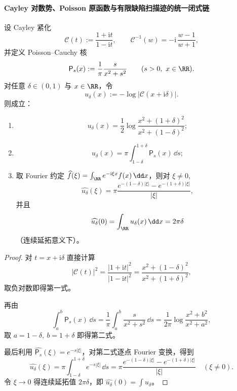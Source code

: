 \paragraph{Cayley 对数势、Poisson 原函数与有限缺陷扫描迹的统一闭式链}

\begin{theorem}\label{thm:xi-cayley-modulus-poisson-fourier-fingerprint}
设 Cayley 紧化
\[
\mathcal C(t):=\frac{1+\mathrm{i}t}{1-\mathrm{i}t},\qquad
\mathcal C^{-1}(w)=-\mathrm{i}\,\frac{w-1}{w+1},
\]
并定义 Poisson--Cauchy 核
\[
\mathsf P_s(x):=\frac{1}{\pi}\frac{s}{x^2+s^2}\qquad(s>0,\ x\in\RR).
\]
对任意 \(\delta\in(0,1)\) 与 \(x\in\RR\)，令
\[
u_\delta(x):=-\log\bigl|\mathcal C(x+\mathrm{i}\delta)\bigr|.
\]
则成立：
\begin{enumerate}
  \item
  \[
  u_\delta(x)=\frac12\log\frac{x^2+(1+\delta)^2}{x^2+(1-\delta)^2};
  \]
  \item
  \[
  u_\delta(x)=\pi\int_{1-\delta}^{1+\delta}\mathsf P_s(x)\,\dd s;
  \]
  \item 取 Fourier 约定 \(\widehat f(\xi)=\int_{\RR}e^{-\mathrm{i}\xi x}f(x)\,\dd x\)，则对 \(\xi\neq 0\),
  \[
  \widehat{u_\delta}(\xi)=
  \pi\frac{e^{-(1-\delta)|\xi|}-e^{-(1+\delta)|\xi|}}{|\xi|},
  \]
  并且
  \[
  \widehat{u_\delta}(0)=\int_{\RR}u_\delta(x)\,\dd x=2\pi\delta
  \]
  （连续延拓意义下）。
\end{enumerate}
\end{theorem}
\begin{proof}
对 \(t=x+\mathrm{i}\delta\) 直接计算
\[
\bigl|\mathcal C(t)\bigr|^2
=\frac{|1+\mathrm{i}t|^2}{|1-\mathrm{i}t|^2}
=\frac{x^2+(1-\delta)^2}{x^2+(1+\delta)^2},
\]
取负对数即得第一式。

再由
\[
\int_a^b\mathsf P_s(x)\,\dd s
=\frac{1}{\pi}\int_a^b\frac{s}{x^2+s^2}\,\dd s
=\frac{1}{2\pi}\log\frac{x^2+b^2}{x^2+a^2},
\]
取 \(a=1-\delta,\ b=1+\delta\) 即得第二式。

最后利用 \(\widehat{\mathsf P_s}(\xi)=e^{-s|\xi|}\)，对第二式逐点 Fourier 变换，得到
\[
\widehat{u_\delta}(\xi)
=\pi\int_{1-\delta}^{1+\delta}e^{-s|\xi|}\,\dd s
=\pi\frac{e^{-(1-\delta)|\xi|}-e^{-(1+\delta)|\xi|}}{|\xi|}\quad(\xi\neq 0).
\]
令 \(\xi\to 0\) 得连续延拓值 \(2\pi\delta\)，即 \(\widehat{u_\delta}(0)=\int u_\delta\)。
\end{proof}

